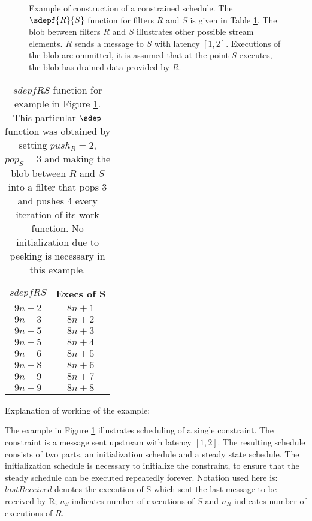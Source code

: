 \begin{figure}[t]
\begin{center}
\caption{{\small Example of construction of a constrained schedule. The $\sdepf{R}{S}$ function for filters $R$ and $S$ is given in Table \ref{tab:sdepconst}. The blob between filters $R$ and $S$ illustrates other possible stream elements. $R$ sends a message to $S$ with latency $[1,2]$. Executions of the blob are ommitted, it is assumed that at the point $S$ executes, the blob has drained data provided by $R$.}}
\end{center}
\vspace{-12pt}
\label{fig:sdepconst}
\end{figure}

\begin{table*}[t]
{\small
\begin{tabular}{|c|c|} \hline
{\bf $sdepf{R}{S}$} & {\bf Execs of S} \\ \hline
$9n+2$ & $8n+1$ \\ \hline
$9n+3$ & $8n+2$ \\ \hline
$9n+5$ & $8n+3$ \\ \hline
$9n+5$ & $8n+4$ \\ \hline
$9n+6$ & $8n+5$ \\ \hline
$9n+8$ & $8n+6$ \\ \hline
$9n+9$ & $8n+7$ \\ \hline
$9n+9$ & $8n+8$ \\ \hline
\end{tabular}}
\caption{\small $sdepf{R}{S}$ function for example in Figure \ref{fig:sdepconst}. This particular $\sdep$ function was obtained by setting $push_R=2$, $pop_S=3$ and making the blob between $R$ and $S$ into a filter that pops 3 and pushes 4 every iteration of its work function. No initialization due to peeking is necessary in this example.}
\label{tab:sdepconst}
\end{table*}


Explanation of working of the example:

The example in Figure \ref{fig:sdepconst} illustrates scheduling of a single constraint. The constraint is a message sent upstream with latency $[1,2]$. The resulting schedule consists of two parts, an initialization schedule and a steady state schedule. The initialization schedule is necessary to initialize the constraint, to ensure that the steady schedule can be executed repeatedly forever. Notation used here is: $lastReceived$ denotes the execution of S which sent the last message to be received by R; $n_S$ indicates number of executions of $S$ and $n_R$ indicates number of executions of $R$.

